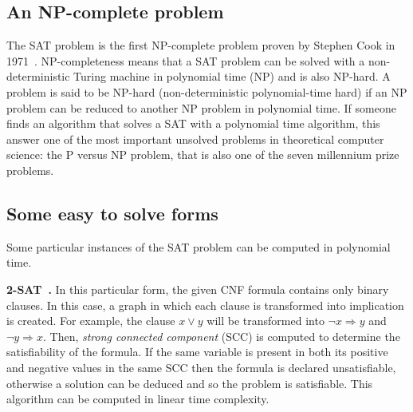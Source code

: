 \subsection{An NP-complete problem}
The SAT problem is the first NP-complete problem proven by Stephen Cook in 1971~\cite{cook1971complexity}.
NP-completeness means that a SAT problem can be solved with a non-deterministic Turing machine in polynomial time (NP) and is also NP-hard.
A problem is said to be NP-hard (non-deterministic polynomial-time hard) if an NP problem 
can be reduced to another NP problem in polynomial time.
If someone finds an algorithm that solves a SAT with a polynomial time algorithm, this answer 
one of the most important unsolved problems in theoretical computer science: the P versus NP problem,
 that is also one of the seven millennium prize problems.
\subsection{Some easy to solve forms}
Some particular instances of the SAT problem can be computed in polynomial time.

\textbf{2-SAT~\cite{aspvall1979linear}.}
In this particular form, the given CNF formula contains only binary clauses.
In this case, a graph in which each clause is transformed into implication is created.
For example, the clause $x \lor y$ will be transformed into $ \neg x \Rightarrow y$ and $\neg y \Rightarrow x$.
Then, \emph{strong connected component} (SCC) is computed to determine the satisfiability of the formula.
If the same variable is present in both its positive and negative values in the same SCC then the formula is declared unsatisfiable,
otherwise a solution can be deduced and so the problem is satisfiable. 
This algorithm can be computed in linear time complexity.

